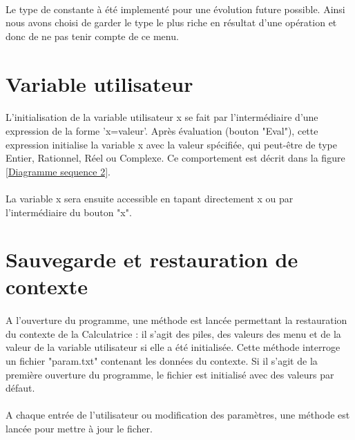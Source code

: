 \documentclass[a4paper,12pt]{report}
\begin{document}
		\paragraph{}Le type de constante à été implementé pour une évolution future possible. Ainsi nous avons choisi de garder le type le plus riche en résultat d'une opération et donc de ne pas tenir compte de ce menu.

	\section{Variable utilisateur}
		\paragraph{}L'initialisation de la variable utilisateur x se fait par l'intermédiaire d'une expression de la forme 'x=valeur'. Après évaluation (bouton "Eval"), cette expression initialise la variable x avec la valeur spécifiée, qui peut-être de type Entier, Rationnel, Réel ou Complexe. Ce comportement est décrit dans la figure \ref{Diagramme sequence 2}.

		\paragraph{}La variable x sera ensuite accessible en tapant directement x ou par l'intermédiaire du bouton "x".

	\section{Sauvegarde et restauration de contexte}
		\paragraph{}A l'ouverture du programme, une méthode est lancée permettant la restauration du contexte de la Calculatrice : il s'agit des piles, des valeurs des menu et de la valeur de la variable utilisateur si elle a été initialisée. Cette méthode interroge un fichier "param.txt" contenant les données du contexte. Si il s'agit de la première ouverture du programme, le fichier est initialisé avec des valeurs par défaut.

		\paragraph{}A chaque entrée de l'utilisateur ou modification des paramètres, une méthode est lancée pour mettre à jour le ficher.
\end{document}
